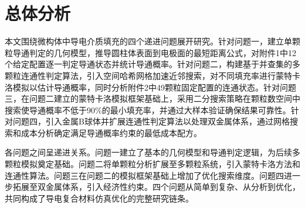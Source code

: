 
\section{总体分析}

本文围绕微构体中导电介质填充的四个递进问题展开研究。针对问题一，建立单颗粒导通判定的几何模型，推导圆柱体表面到电极面的最短距离公式，对附件1中12个给定配置逐一判定导通状态并统计导通概率。针对问题二，构建基于并查集的多颗粒连通性判定算法，引入空间哈希网格加速近邻搜索，对不同填充率进行蒙特卡洛模拟以估计导通概率，同时分析附件2中49颗粒固定配置的连通状态。针对问题三，在问题二建立的蒙特卡洛模拟框架基础上，采用二分搜索策略在颗粒数空间中搜索使导通概率不低于90\%的最小填充率，并通过大样本验证确保结果可靠性。针对问题四，引入金属B球体并扩展连通性判定算法以处理双金属体系，通过网格搜索和成本分析确定满足导通概率约束的最低成本配方。

各问题之间呈递进关系。问题一建立了基本的几何模型和导通判定逻辑，为后续多颗粒模拟奠定基础。问题二将单颗粒分析扩展至多颗粒系统，引入蒙特卡洛方法和连通性算法。问题三在问题二的模拟框架基础上增加了优化搜索维度。问题四进一步拓展至双金属体系，引入经济性约束。四个问题从简单到复杂、从分析到优化，共同构成了导电复合材料仿真优化的完整研究链条。
